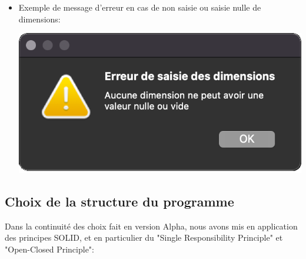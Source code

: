 \begin{itemize}
\item Exemple de message d’erreur en cas de non saisie ou saisie nulle de dimensions:

\begin{center}
    \includegraphics[scale=0.25]{images/betaErreurSaisie.png}
\end{center}


\end{itemize}

\subsection{Choix de la structure du programme}

Dans la continuité des choix fait en version Alpha, nous avons mis en application des principes SOLID, et en particulier du
"Single Responsibility Principle" et "Open-Closed Principle":

